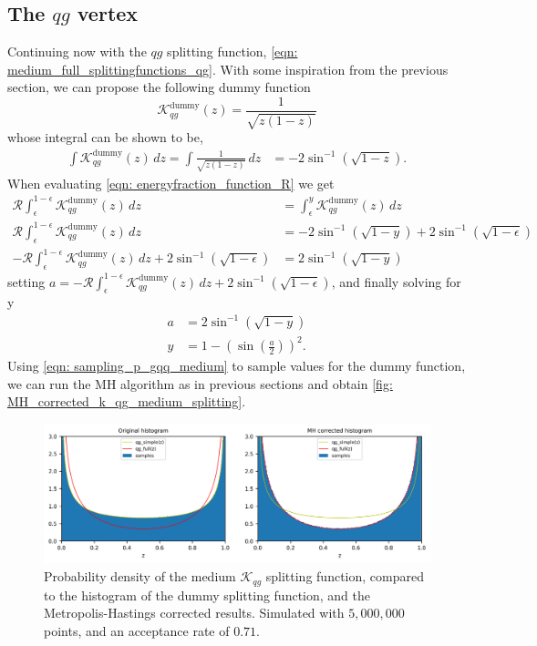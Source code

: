 \documentclass[main.tex]{subfiles}
\begin{document}
\subsection*{The \(qg\) vertex}
Continuing now with the \(qg\) splitting function, \autoref{eqn: medium_full_splittingfunctions_qg}. With some inspiration from the previous section, we can propose the following dummy function
\begin{equation}
    \mathcal{K}_{qg}^{\text{dummy}}(z) = \frac{1}{\sqrt{z (1-z)}}
\end{equation}
whose integral can be shown to be, 
\begin{align}
    \int \mathcal{K}_{qg}^{\text{dummy}}(z) \, dz = \int \frac{1}{\sqrt{z(1-z)}}\, dz &= -2 \sin^{-1}(\sqrt{1-z}).
\end{align}
When evaluating \autoref{eqn: energyfraction_function_R} we get
\begin{align}
    \mathcal{R} \int_\epsilon^{1-\epsilon} \mathcal{K}_{qg}^{\text{dummy}}(z)\,dz  &= \int_\epsilon^{y} \mathcal{K}_{qg}^{\text{dummy}}(z)\,dz  \nonumber\\
    \mathcal{R} \int_\epsilon^{1-\epsilon} \mathcal{K}_{qg}^{\text{dummy}}(z)\,dz &= -2 \sin^{-1}(\sqrt{1-y}) + 2 \sin^{-1}(\sqrt{1-\epsilon}) \nonumber\\
    -\mathcal{R} \int_\epsilon^{1-\epsilon} \mathcal{K}_{qg}^{\text{dummy}}(z)\,dz + 2 \sin^{-1}(\sqrt{1-\epsilon}) &= 2 \sin^{-1}(\sqrt{1-y}) 
\end{align}
setting \(a = -\mathcal{R} \int_\epsilon^{1-\epsilon} \mathcal{K}_{qg}^{\text{dummy}}(z)\,dz + 2 \sin^{-1}(\sqrt{1-\epsilon})\), and finally solving for y
\begin{align}\label{eqn: sampling_p_gqq_medium}
    a &= 2 \sin^{-1}(\sqrt{1-y}) \nonumber\\
    y &= 1- \left(\sin (\frac{a}{2})\right)^2.
\end{align}
Using \autoref{eqn: sampling_p_gqq_medium} to sample values for the dummy function, we can run the MH algorithm as in previous sections and obtain \autoref{fig: MH_corrected_k_qg_medium_splitting}.
\begin{figure}[htb]
    \centering
    \includegraphics[width=15cm]{pictures/plots/Metropolis-Hastings/MH_medium_qg.png}
    \caption{Probability density of the medium \(\mathcal{K}_{qg}\) splitting function, compared to the histogram of the dummy splitting function, and the Metropolis-Hastings corrected results. Simulated with \(5,000,000\) points, and an acceptance rate of \(0.71\).}
    \label{fig: MH_corrected_k_qg_medium_splitting}
\end{figure}
\end{document}
